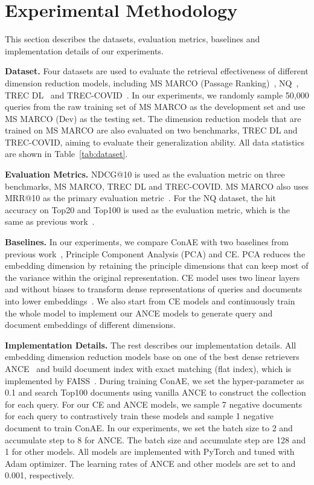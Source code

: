 \documentclass[11pt]{article}
\begin{document}
 
\section{Experimental Methodology}
This section describes the datasets, evaluation metrics, baselines and implementation details of our experiments.


\textbf{Dataset.} Four datasets are used to evaluate the retrieval effectiveness of different dimension reduction models, including MS MARCO (Passage Ranking)~\cite{bajaj2016ms}, NQ~\cite{kwiatkowski2019natural}, TREC DL~\cite{craswelloverview} and TREC-COVID~\cite{roberts2020trec}.
In our experiments, we randomly sample 50,000 queries from the raw training set of MS MARCO as the development set and use MS MARCO (Dev) as the testing set. The dimension reduction models that are trained on MS MARCO are also evaluated on two benchmarks, TREC DL and TREC-COVID, aiming to evaluate their generalization ability. All data statistics are shown in Table~\ref{tab:dataset}.



\textbf{Evaluation Metrics.} NDCG@10 is used as the evaluation metric on three benchmarks, MS MARCO, TREC DL and TREC-COVID. MS MARCO also uses MRR@10 as the primary evaluation metric~\cite{bajaj2016ms}. For the NQ dataset, the hit accuracy on Top20 and Top100 is used as the evaluation metric, which is the same as previous work~\cite{karpukhin2020dense}.

\textbf{Baselines.} In our experiments, we compare ConAE with two baselines from previous work~\cite{ma2021simple}, Principle Component Analysis (PCA) and CE. PCA reduces the embedding dimension by retaining the principle dimensions that can keep most of the variance within the original representation. CE model uses two linear layers  and  without biases to transform dense representations of queries and documents into lower embeddings~\cite{ma2021simple}. We also start from CE models and continuously train the whole model to implement our ANCE models to generate query and document embeddings of different dimensions.

\textbf{Implementation Details.}
The rest describes our implementation details. 
All embedding dimension reduction models base on one of the best dense retrievers ANCE~\cite{xiong2020approximate} and build document index with exact matching (flat index), which is implemented by FAISS~\cite{johnson2019billion}. During training ConAE, we set the hyper-parameter  as 0.1 and search Top100 documents using vanilla ANCE to construct the  collection for each query. For our CE and ANCE models, we sample 7 negative documents for each query to contrastively train these models and sample 1 negative document to train ConAE. In our experiments, we set the batch size to 2 and accumulate step to 8 for ANCE. The batch size and accumulate step are 128 and 1 for other models. All models are implemented with PyTorch and tuned with Adam optimizer. The learning rates of ANCE and other models are set to  and 0.001, respectively.
\end{document}
